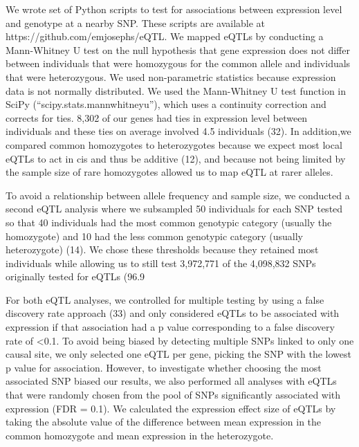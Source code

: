 We wrote set of Python scripts to test for associations between expression level and genotype at a nearby SNP. These scripts are available at https://github.com/emjosephs/eQTL. We mapped eQTLs by conducting a Mann-Whitney U test on the null hypothesis that gene expression does not differ between individuals that were homozygous for the common allele and individuals that were heterozygous. We used non-parametric statistics because expression data is not normally distributed. We used the Mann-Whitney U test function in SciPy (“scipy.stats.mannwhitneyu”), which uses a continuity correction and corrects for ties. 8,302 of our genes had ties in expression level between individuals and these ties on average involved 4.5 individuals (32). In addition,we compared common homozygotes to heterozygotes because we expect most local eQTLs to act in cis and thus be additive (12), and because not being limited by the sample size of rare homozygotes allowed us to map eQTL at rarer alleles. 

To avoid a relationship between allele frequency and sample size, we conducted a second eQTL analysis where we subsampled 50 individuals for each SNP tested so that 40 individuals had the most common genotypic category (usually the homozygote) and 10 had the less common genotypic category (usually heterozygote) (14). We chose these thresholds because they retained most individuals while allowing us to still test 3,972,771 of the 4,098,832 SNPs originally tested for eQTLs (96.9%

For both eQTL analyses, we controlled for multiple testing by using a false discovery rate approach (33) and only considered eQTLs to be associated with expression if that association had a p value corresponding to a false discovery rate of <0.1. To avoid being biased by detecting multiple SNPs linked to only one causal site, we only selected one eQTL per gene, picking the SNP with the lowest p value for association. However, to investigate whether choosing the most associated SNP biased our results, we also performed all analyses with eQTLs that were randomly chosen from the pool of SNPs significantly associated with expression (FDR = 0.1). We calculated the expression effect size of eQTLs by taking the absolute value of the difference between mean expression in the common homozygote and mean expression in the heterozygote. 

